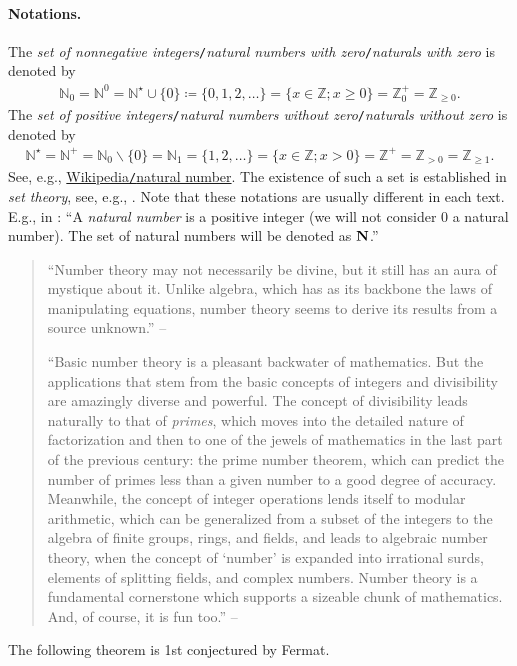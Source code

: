 \documentclass[oneside]{book}
\numberwithin{equation}{section}
\begin{document}
\paragraph{Notations.} The \textit{set of nonnegative integers}\texttt{/}\textit{natural numbers with zero}\texttt{/}\textit{naturals with zero} is denoted by
\begin{align*}
	\mathbb{N}_0 = \mathbb{N}^0 = \mathbb{N}^\star\cup\{0\}\coloneqq\{0,1,2,\ldots\} = \{x\in\mathbb{Z};x\ge 0\} = \mathbb{Z}_0^+ = \mathbb{Z}_{\ge 0}.
\end{align*}
The \textit{set of positive integers}\texttt{/}\textit{natural numbers without zero}\texttt{/}\textit{naturals without zero} is denoted by
\begin{align*}
	\mathbb{N}^\star = \mathbb{N}^+ = \mathbb{N}_0\backslash\{0\} = \mathbb{N}_1 = \{1,2,\ldots\} = \{x\in\mathbb{Z};x > 0\} = \mathbb{Z}^+ = \mathbb{Z}_{> 0} = \mathbb{Z}_{\ge 1}.
\end{align*}
See, e.g., \href{https://en.wikipedia.org/wiki/Natural_number}{Wikipedia\texttt{/}natural number}. The existence of such a set is established in \textit{set theory}, see, e.g., \cite{Halmos1960, Halmos1974, Kaplansky1972, Kaplansky1977}. Note that these notations are usually different in each text. E.g., in \cite[Chap. 2, p. 10]{Tao2006}: ``A \textit{natural number} is a positive integer (we will not consider 0 a natural number). The set of natural numbers will be denoted as ${\bf N}$.''

\begin{quotation}
	``Number theory may not necessarily be divine, but it still has an aura of mystique about it. Unlike algebra, which has as its backbone the laws of manipulating equations, number theory seems to derive its results from a source unknown.'' -- \cite[Chap. 2, p. 9]{Tao2006}
	
	``Basic number theory is a pleasant backwater of mathematics. But the applications that stem from the basic concepts of integers and divisibility are amazingly diverse and powerful. The concept of divisibility leads naturally to that of \textit{primes}, which moves into the detailed nature of factorization and then to one of the jewels of mathematics in the last part of the previous century: the prime number theorem, which can predict the number of primes less than a given number to a good degree of accuracy. Meanwhile, the concept of integer operations lends itself to modular arithmetic, which can be generalized from a subset of the integers to the algebra of finite groups, rings, and fields, and leads to algebraic number theory, when the concept of `number' is expanded into irrational surds, elements of splitting 	fields, and complex numbers. Number theory is a fundamental cornerstone which supports a sizeable chunk of mathematics. And, of course, it is fun too.'' -- \cite[Chap. 2, p. 10]{Tao2006}
\end{quotation}
The following theorem is 1st conjectured by Fermat.
\end{document}
